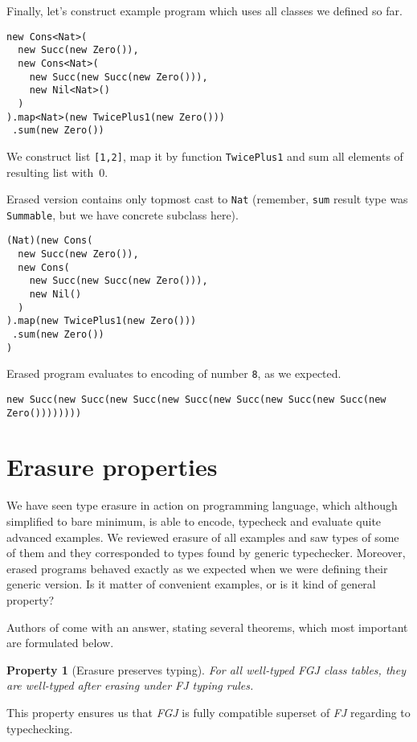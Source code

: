 \documentclass{article}[12pt]
\begin{document}
Finally, let's construct example program which uses all classes
we defined so far.

\begin{verbatim}
new Cons<Nat>(
  new Succ(new Zero()),
  new Cons<Nat>(
    new Succ(new Succ(new Zero())),
    new Nil<Nat>()
  )
).map<Nat>(new TwicePlus1(new Zero()))
 .sum(new Zero())
\end{verbatim}

We construct list \texttt{[1,2]}, map it by function
\texttt{TwicePlus1} and sum all elements of resulting list
with~0.

Erased version contains only topmost cast to \texttt{Nat}
(remember, \texttt{sum} result type was \texttt{Summable},
but we have concrete subclass here).

\begin{verbatim}
(Nat)(new Cons(
  new Succ(new Zero()),
  new Cons(
    new Succ(new Succ(new Zero())),
    new Nil()
  )
).map(new TwicePlus1(new Zero()))
 .sum(new Zero())
)
\end{verbatim}

Erased program evaluates to encoding of number \texttt{8},
as we expected.

\begin{verbatim}
new Succ(new Succ(new Succ(new Succ(new Succ(new Succ(new Succ(new Zero())))))))
\end{verbatim}


\section{Erasure properties}

We have seen type erasure in action on programming language,
which although simplified to bare minimum, is able to encode,
typecheck and evaluate quite advanced examples. We reviewed
erasure of all examples and saw types of some of them and
they corresponded to types found by generic typechecker. Moreover,
erased programs behaved exactly as we expected when we were
defining their generic version. Is it matter of convenient
examples, or is it kind of general property?

Authors of \cite{fj} come with an answer, stating several theorems,
which most important are formulated below.
\newtheorem{theorem}{Property}
\begin{theorem}[Erasure preserves typing]
For all well-typed \emph{FGJ} class tables, they are well-typed
after erasing under \emph{FJ} typing rules.
\end{theorem}
This property ensures us that \emph{FGJ} is fully compatible
superset of \emph{FJ} regarding to typechecking.
\end{document}
